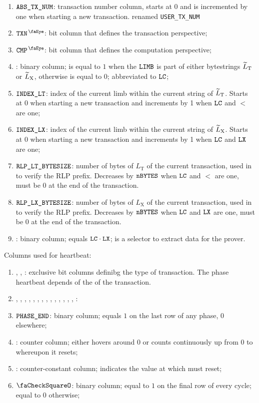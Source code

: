 \begin{enumerate}
    \item $\texttt{ABS\_TX\_NUM}$:
	transaction number column, starts at 0 and is incremented by one when starting a new transaction. \specTodo{} renamed \texttt{USER\_TX\_NUM}
    \item $\isTxn$:
	bit column that defines the transaction perspective;
	\item $\isCmp$:
	bit column that defines the computation perspective;
	\item {}:
    binary column;
    is equal to $1$ when the $\texttt{LIMB}$ is part of either \rlp{} bytestrings $\widetilde{L}_{\mathrm{T}}$ or $\widetilde{L}_{\mathrm{X}}$, otherwise is equal to $0$;
    abbreviated to $\texttt{LC}$;
    \item $\texttt{INDEX\_LT}$:
    index of the current limb within the current string of $\widetilde{L}_{\mathrm{T}}$. Starts at 0 when starting a new transaction and increments by 1 when $\texttt{LC}$ and $\lt$ are one; 
    \item $\texttt{INDEX\_LX}$:                                                       
    index of the current limb within the current string of $\widetilde{L}_{\mathrm{X}}$. Starts at 0 when starting a new transaction and increments by 1 when $\texttt{LC}$ and $\texttt{LX}$ are one;
    \item $\texttt{RLP\_LT\_BYTESIZE}$:
    number of bytes of $L_{\mathrm{T}}$ of the current transaction, used in \phaseRlpPrefix{} to verify the RLP prefix. Decreases by $\texttt{nBYTES}$ when $\texttt{LC}$ and $\lt$ are one, must be 0 at the end of the transaction.
    \item $\texttt{RLP\_LX\_BYTESIZE}$:
    number of bytes of $L_{\mathrm{X}}$ of the current transaction, used in \phaseRlpPrefix{} to verify the RLP prefix. Decreases by $\texttt{nBYTES}$ when $\texttt{LC}$ and $\texttt{LX}$ are one, must be 0 at the end of the transaction.
    \item \toHashByProver{}:
    binary column; equals $\texttt{LC} \cdot \texttt{LX}$; is a selector to extract data for the prover.
\end{enumerate}
Columns used for heartbeat:
\begin{enumerate}[resume]
    \item \typeZeroTx{}, \typeOneTx{}, \typeTwoTx{}:
    exclusive bit columns definibg the type of transaction. The phase heartbeat depends of the \transactionType{} of the transaction.
    \item \phaseRlpPrefix{}, \phaseChainId{}, \phaseNonce{}, \phaseGasPrice{}, \phaseMaxPriorityFeePerGas{}, \phaseMaxFeePerGas{}, \phaseGasLimit{}, \phaseTo{}, \phaseValue{}, \phaseData{}, \phaseAccessList{}, \phaseBeta{}, \phaseY{}, \phaseR{}, \phaseS{}:
    \item $\texttt{PHASE\_END}$:
    binary column; equals $1$ on the last row of any phase, $0$ elsewhere;
    \item \ct{}:
	counter column; 
	either hovers around $0$ or counts continuously up from $0$ to \maxCt{} whereupon it resets;
    \item \maxCt:
	counter-constant column;
	indicates the value at which \ct{} must reset;
	\item $\done$:
    binary column; equal to $1$ on the final row of every \ct{} cycle; equal to $0$ otherwise;
\end{enumerate}
